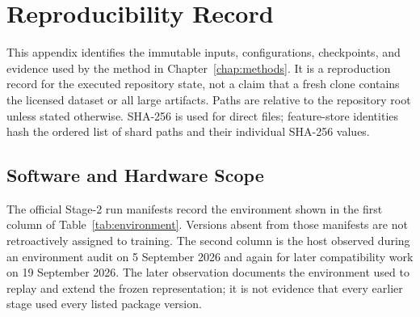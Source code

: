
\chapter{Reproducibility Record}
\label{app:reproducibility}

This appendix identifies the immutable inputs, configurations, checkpoints, and evidence used by the method in Chapter~\ref{chap:methods}. It is a reproduction record for the executed repository state, not a claim that a fresh clone contains the licensed dataset or all large artifacts. Paths are relative to the repository root unless stated otherwise. SHA-256 is used for direct files; feature-store identities hash the ordered list of shard paths and their individual SHA-256 values.

\section{Software and Hardware Scope}
\label{app:environment}

The official Stage-2 run manifests record the environment shown in the first column of Table~\ref{tab:environment}. Versions absent from those manifests are not retroactively assigned to training. The second column is the host observed during an environment audit on 5 September 2026 and again for later compatibility work on 19 September 2026. The later observation documents the environment used to replay and extend the frozen representation; it is not evidence that every earlier stage used every listed package version.

